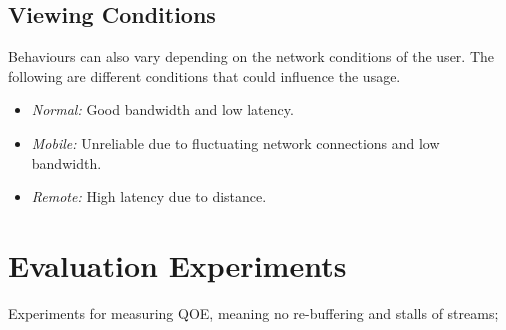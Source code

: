 \subsection{Viewing Conditions}
\label{sec:viewing-conmditions}
Behaviours can also vary depending on the network conditions of the user. The following are different conditions that could influence the usage.
\begin{itemize}
    \item \textit{Normal:}
    Good bandwidth and low latency.
    \item \textit{Mobile:}
    Unreliable due to fluctuating network connections and low bandwidth.
    \item \textit{Remote:}
    High latency due to distance.
\end{itemize}


\section{Evaluation Experiments}
\label{sec:des-evaluation}
Experiments for measuring \ac{QOE}, meaning no re-buffering and stalls of streams;
